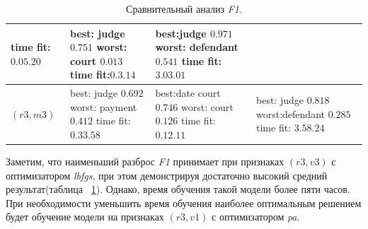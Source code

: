 \documentclass{csmathnotes}
\begin{document}
\begin{table}[!h]
\begin{center}
\begin{tabular}{|p{2.1cm}|p{2.5cm}|p{2.5cm}|p{2.5cm}|}
            time fit:\newline $0.05.20$ \newline
            & best: \newline judge    $0.751$ \newline
              worst: \newline court  $0.013$ \newline
              time fit:\newline $0.3.14$
            & best:\newline  judge $0.971$\newline
              worst: \newline defendant  $0.541$\newline
              time fit:\newline $3.03.01$\\
            \hline
            $(r3, m3)$
            & best: \newline judge $0.692$ \newline
            worst: \newline payment $0.412$ \newline
            time fit: \newline  $0.33.58$
            & best:\newline   date court   $0.746$ \newline
             worst: \newline court $0.126$ \newline
             time fit: \newline $0.12.11$
            & best: \newline   judge $0.818$ \newline
              worst:\newline defendant $0.285$ \newline 
              time fit: \newline $3.58.24$\\
            \hline
        \end{tabular}
    \end{center}
    \caption{\label{tabl:table2}Сравнительный анализ \emph{F1}.}
\end{table}

Заметим, что наименьший разброс \emph{F1}  принимает при признаках $(r3,v3)$ с оптимизатором \emph{lbfgs}, при этом демонстрируя достаточно высокий средний результат(таблица ~\ref{tabl:table2}). Однако, время обучения такой модели более пяти часов. При необходимости уменьшить время обучения наиболее оптимальным решением будет обучение модели на признаках $(r3,v1)$ с оптимизатором \emph{pa}.
\end{document}
